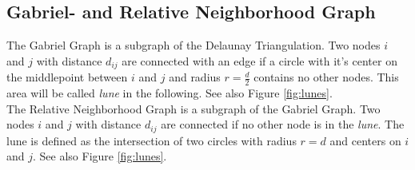 
\subsection{Gabriel- and Relative Neighborhood Graph}
\label{sec:graphtypes}
    The Gabriel Graph \cite{Gabriel1969} is a subgraph of the
    Delaunay Triangulation. Two nodes \(i\) and \(j\) with distance
    \(d_{ij}\) are connected with an edge if a circle with it's
    center on the middlepoint between \(i\) and \(j\) and radius
    \(r = \frac d 2\) contains no other nodes. This area will be
    called \emph{lune} in the following. See also Figure
    \ref{fig:lunes}.\\
    The Relative Neighborhood Graph \cite{Toussaint1980} is a
    subgraph of the Gabriel Graph. Two nodes \(i\) and \(j\) with
    distance \(d_{ij}\) are connected if no other node is in the
    \emph{lune}. The lune is defined as the intersection of two
    circles with radius \(r = d\) and centers on \(i\) and \(j\).
    See also Figure \ref{fig:lunes}.
